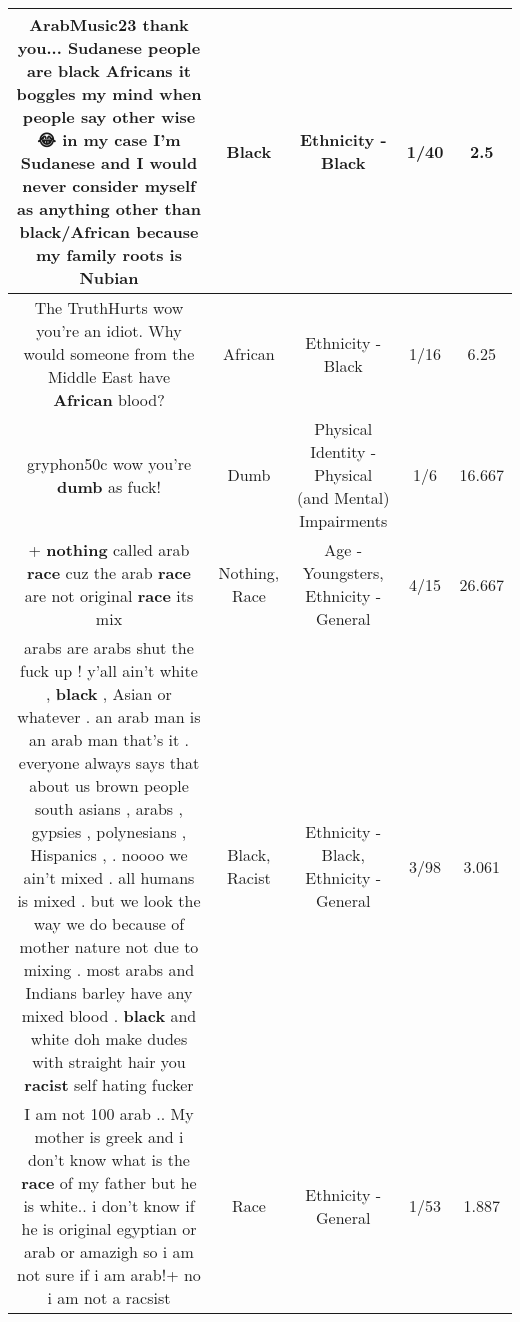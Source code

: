 \documentclass[11pt]{article}
\newlength\mylength
\begin{document}
\begin{center}
\begin{longtable}{|C{.65\mylength}|C{.30\mylength}|C{.12\mylength}|C{.12\mylength}|C{.12\mylength}|}
  \small ArabMusic23 thank you... Sudanese people are \textbf{black} Africans it boggles my mind when people say other wise 😂 in my case I'm Sudanese and I would never consider myself as anything other than \textbf{black}/African because my family roots is Nubian\normalsize   & Black & Ethnicity - Black & 1/40 & 2.5 \\  \hline
  \small The TruthHurts wow you're an idiot. Why would someone from the Middle East have \textbf{African} blood?\normalsize   & African & Ethnicity - Black & 1/16 & 6.25 \\  \hline
  \small gryphon50c wow you're \textbf{dumb} as fuck!\normalsize   & Dumb & Physical Identity - Physical (and Mental) Impairments & 1/6 & 16.667 \\  \hline
  \small + \textbf{nothing} called arab \textbf{race} cuz the arab \textbf{race} are not original \textbf{race} its mix\normalsize   & Nothing, Race & Age - Youngsters, Ethnicity - General & 4/15 & 26.667 \\  \hline
  \small arabs are arabs shut the fuck up ! y'all ain't white , \textbf{black} , Asian or whatever . an arab man is an arab man that's it . everyone always says that about us  brown people south asians , arabs , gypsies , polynesians , Hispanics , . noooo we ain't mixed . all humans is mixed  . but we look the way we do because of mother nature not due to mixing . most arabs and Indians barley have any mixed blood . \textbf{black} and white doh make dudes with straight hair you \textbf{racist} self hating fucker\normalsize   & Black, Racist & Ethnicity - Black, Ethnicity - General & 3/98 & 3.061 \\  \hline
  \small I am not 100 arab .. My mother is greek and i don't know what is the \textbf{race} of my father but he is white.. i don't know if he is original egyptian or arab or amazigh so i am not sure if i am arab!+ no i am not a racsist\normalsize   & Race & Ethnicity - General & 1/53 & 1.887 \\  \hline

\end{longtable}
\end{center}
\end{document}
